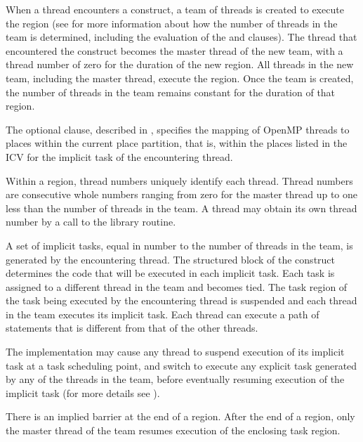 \descr
When a thread encounters a  construct, a team of threads is created to
execute the  region (see
for more information about how the number of threads in the team is determined, 
including the evaluation of the  and  clauses). The 
thread that encountered the  construct becomes the master thread 
of the new team, with a thread number of zero for the duration of the new 
 region. All threads in the new team, including the master thread, 
execute the region. Once the team is created, the number of threads in the
team remains constant for the duration of that  region.

The optional  clause, described in
, specifies the mapping of 
OpenMP threads to places within the current place partition, that is, within
the places listed in the  ICV for the implicit task 
of the encountering thread.

Within a  region, thread numbers uniquely identify each thread. Thread
numbers are consecutive whole numbers ranging from zero for the master thread up to
one less than the number of threads in the team. A thread may obtain its own thread
number by a call to the  library routine.

A set of implicit tasks, equal in number to the number of threads in the team, is
generated by the encountering thread. The structured block of the  
construct determines the code that will be executed in each implicit task. Each 
task is assigned to a different thread in the team and becomes tied. The task region 
of the task being executed by the encountering thread is suspended and each thread 
in the team executes its implicit task. Each thread can execute a path of statements 
that is different from that of the other threads.

The implementation may cause any thread to suspend execution of its implicit task at a
task scheduling point, and switch to execute any explicit task generated by any of the
threads in the team, before eventually resuming execution of the implicit task (for more
details see ).

There is an implied barrier at the end of a  region. After the end of a
 region, only the master thread of the team resumes execution of the
enclosing task region.

